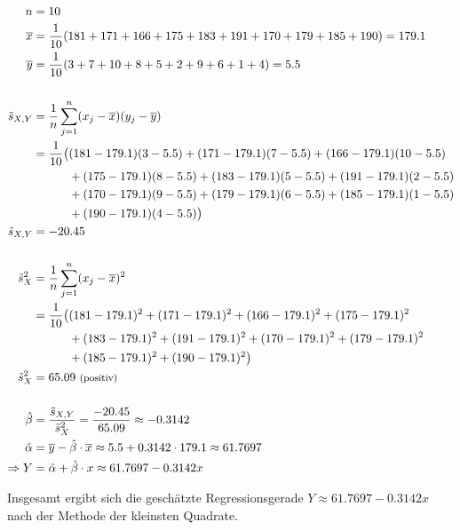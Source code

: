 \vspace{-0.5cm}
{\allowdisplaybreaks
    \begin{align*}
        n &= 10 \\*
        \overline{x} &= \frac{1}{10} (181 + 171 + 166 + 175 + 183 +191 + 170 + 179 + 185 + 190) = 179.1 \\*
        \overline{y} &= \frac{1}{10} (3 + 7 + 10 + 8 + 5 + 2 + 9 + 6 + 1 + 4) = 5.5 \\*
        \nonumber \\
        \tilde{s}_{X,Y} &= \frac1n \sum_{j=1}^{n} (x_j - \overline{x})(y_j - \overline{y}) \\*
        &= \frac{1}{10} \big( (181 - 179.1) (3 - 5.5) + (171 - 179.1) (7 - 5.5) + (166 - 179.1) (10 - 5.5) \\*
            &\qquad\quad + (175 - 179.1) (8 - 5.5)  + (183 - 179.1) (5 - 5.5) + (191 - 179.1) (2 - 5.5) \\*
            &\qquad\quad + (170 - 179.1) (9 - 5.5) + (179 - 179.1) (6 - 5.5) + (185 - 179.1) (1 - 5.5) \\*
            &\qquad\quad + (190 - 179.1) (4 - 5.5) \big) \\*
        \tilde{s}_{X,Y} &= -20.45 \\
        \nonumber \\
        \tilde{s}_X^2 &= \frac1n \sum_{j=1}^{n} (x_j - \overline{x})^2 \\*
        &= \frac{1}{10} \big( (181 - 179.1)^2 + (171 - 179.1)^2 + (166 - 179.1)^2 + (175 - 179.1)^2 \\*
            &\qquad\quad + (183 - 179.1)^2 + (191 - 179.1)^2 + (170 - 179.1)^2 + (179 - 179.1)^2 \\*
            &\qquad\quad + (185 - 179.1)^2 + (190 - 179.1)^2 \big) \\*
        \tilde{s}_X^2 &= 65.09 ~{\text{\footnotesize(positiv)}} \\
        \nonumber \\
        \hat\beta &= \frac{\tilde{s}_{X,Y}}{\tilde{s}_X^2}
            = \frac{-20.45}{65.09} \approx -0.3142 \\*
        \hat\alpha &= \overline{y} - \hat\beta\cdot\overline{x} \approx 5.5 + 0.3142 \cdot 179.1 \approx 61.7697 \\*
        \Rightarrow Y &= \hat\alpha + \hat\beta\cdot x \approx 61.7697 - 0.3142x
    \end{align*}
}

Insgesamt ergibt sich die geschätzte Regressionsgerade $Y \approx 61.7697 - 0.3142x$ nach der Methode der kleinsten Quadrate.


